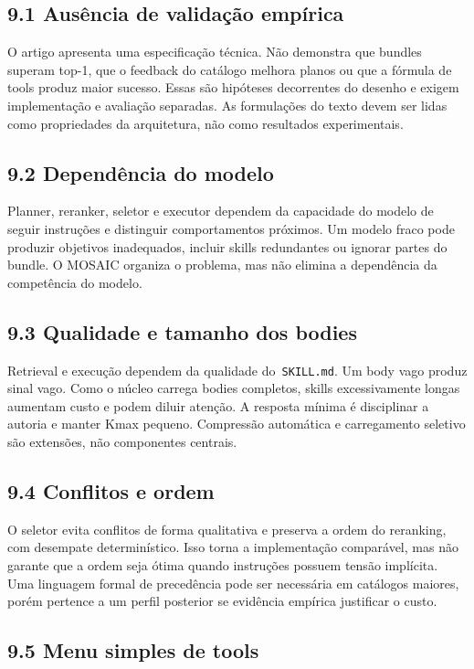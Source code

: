 \documentclass[12pt,a4paper]{article}
\begin{document}
\subsection*{9.1 Ausência de validação empírica}

O artigo apresenta uma especificação técnica. Não demonstra que bundles superam top-1, que o feedback do catálogo melhora planos ou que a fórmula de tools produz maior sucesso. Essas são hipóteses decorrentes do desenho e exigem implementação e avaliação separadas. As formulações do texto devem ser lidas como propriedades da arquitetura, não como resultados experimentais.


\subsection*{9.2 Dependência do modelo}

Planner, reranker, seletor e executor dependem da capacidade do modelo de seguir instruções e distinguir comportamentos próximos. Um modelo fraco pode produzir objetivos inadequados, incluir skills redundantes ou ignorar partes do bundle. O MOSAIC organiza o problema, mas não elimina a dependência da competência do modelo.


\subsection*{9.3 Qualidade e tamanho dos bodies}

Retrieval e execução dependem da qualidade do\texttt{ SKILL.md}. Um body vago produz sinal vago. Como o núcleo carrega bodies completos, skills excessivamente longas aumentam custo e podem diluir atenção. A resposta mínima é disciplinar a autoria e manter Kmax pequeno. Compressão automática e carregamento seletivo são extensões, não componentes centrais.


\subsection*{9.4 Conflitos e ordem}

O seletor evita conflitos de forma qualitativa e preserva a ordem do reranking, com desempate determinístico. Isso torna a implementação comparável, mas não garante que a ordem seja ótima quando instruções possuem tensão implícita. Uma linguagem formal de precedência pode ser necessária em catálogos maiores, porém pertence a um perfil posterior se evidência empírica justificar o custo.


\subsection*{9.5 Menu simples de tools}
\end{document}
